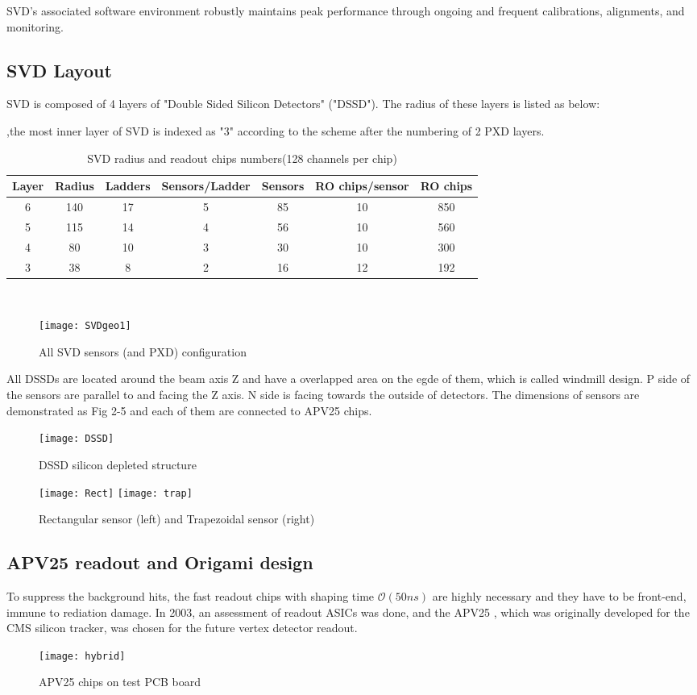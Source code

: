 	SVD's associated software environment robustly maintains peak performance through ongoing and frequent calibrations, alignments, and monitoring.
	
	
	\subsection{SVD Layout}
	SVD is composed of 4 layers of "Double Sided  Silicon Detectors" ("DSSD"). The radius of these layers is listed as below:
	
	\begin{table}
		\large 
		\centering
	    \caption{SVD radius and readout chips numbers(128 channels per chip)},the most inner layer of SVD is indexed as "3" according to the scheme after the numbering of 2 PXD layers. 
		\begin{tabular}{c|c|c|c|c|c|c}
		\hline
		Layer & Radius & Ladders & Sensors/Ladder & Sensors & RO chips/sensor & RO chips \\
		\hline
		6 & 140 & 17 & 5 & 85 & 10 & 850 \\
		\hline
		5 & 115 & 14 & 4 & 56 & 10 & 560\\
		\hline
		4 & 80 & 10 & 3 & 30 & 10 & 300	\\
		\hline
		3 & 38 & 8 & 2 & 16 & 12 & 192 \\
		\hline
	    \end{tabular}
	\end{table}

　\begin{figure}[htbp]
	\centering
	\texttt{[image: SVDgeo1]}
	\caption{All SVD sensors (and PXD) configuration }
\end{figure}
	
	All DSSDs are located around the beam axis Z and have a overlapped area on the egde of them, which is called windmill design. P side of the sensors are parallel to and facing the Z axis. N side is facing towards the outside of detectors. The dimensions of sensors are demonstrated as Fig 2-5 and each of them are connected to APV25 chips.\cite{abe2010belle}
	
	\begin{figure}[htbp]
		\centering
		\texttt{[image: DSSD]}
		\caption{DSSD silicon depleted structure}
		\texttt{[image: Rect]}
		\texttt{[image: trap]}
		\caption{Rectangular sensor (left) and Trapezoidal sensor (right) }
	\end{figure}

\subsection{APV25 readout and Origami design}
	To suppress the background hits, the fast readout chips with shaping time $\mathcal{O}(50 ns)$ are highly necessary and they have to be front-end, immune to rediation damage. In 2003, an assessment of readout ASICs was done, and the APV25 \cite{APV}, which was originally developed for the CMS silicon tracker, was chosen for the future vertex detector readout.
\begin{figure}[htbp]
	\centering
	\texttt{[image: hybrid]}
	\caption{APV25 chips on test PCB board}
\end{figure}

